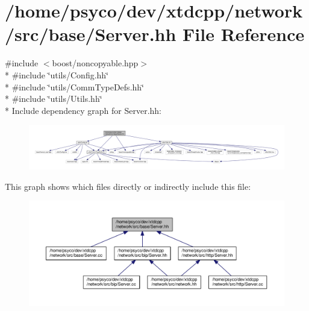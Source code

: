 \hypertarget{base_2Server_8hh}{}\section{/home/psyco/dev/xtdcpp/network/src/base/\+Server.hh File Reference}
\label{base_2Server_8hh}
{\ttfamily \#include $<$boost/noncopyable.\+hpp$>$}\\*
{\ttfamily \#include \char`\"{}utils/\+Config.\+hh\char`\"{}}\\*
{\ttfamily \#include \char`\"{}utils/\+Comm\+Type\+Defs.\+hh\char`\"{}}\\*
{\ttfamily \#include \char`\"{}utils/\+Utils.\+hh\char`\"{}}\\*
Include dependency graph for Server.\+hh\+:
\nopagebreak
\begin{figure}[H]
\begin{center}
\leavevmode
\includegraphics[width=350pt]{base_2Server_8hh__incl}
\end{center}
\end{figure}
This graph shows which files directly or indirectly include this file\+:
\nopagebreak
\begin{figure}[H]
\begin{center}
\leavevmode
\includegraphics[width=350pt]{base_2Server_8hh__dep__incl}
\end{center}
\end{figure}

